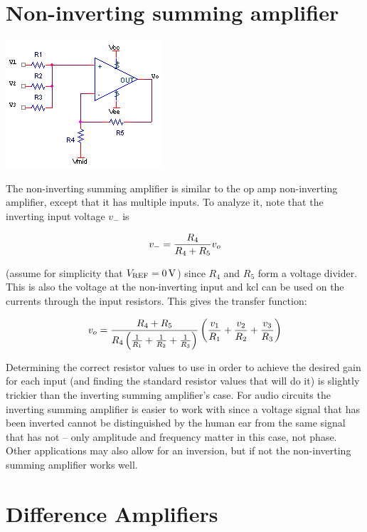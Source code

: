 \section{Non-inverting summing amplifier}
\begin{center}
	\includegraphics{schematics/summingamp.PNG}
\end{center}
The non-inverting summing amplifier is similar to the op amp non-inverting amplifier, except that it has multiple inputs. To analyze it, note that the inverting input voltage $v_{-}$ is

\begin{equation}
v_{-} = \frac{R_4}{R_4 + R_5}\vout
\end{equation}

(assume for simplicity that $V\sub{REF} = \SI{0}{\V}$) since $R_4$ and $R_5$ form a voltage divider.
This is also the voltage at the non-inverting input and \ac{kcl} can be used on the currents through the input resistors.
This gives the transfer function:

\textcolor{red}{
\begin{equation}
\vout = \frac{R_4 + R_5}{R_4\left(\frac{1}{R_1} + \frac{1}{R_2} + \frac{1}{R_3}\right)}\left(\frac{v_1}{R_1} + \frac{v_2}{R_2} + \frac{v_3}{R_3}\right)
\label{eq:summingamp}
\end{equation}
}

Determining the correct resistor values to use in order to achieve the desired gain for each input (and finding the standard resistor values that will do it) is slightly trickier than the inverting summing amplifier's case.
For audio circuits the inverting summing amplifier is easier to work with since a voltage signal that has been inverted cannot be distinguished by the human ear from the same signal that has not -- only amplitude and frequency matter in this case, not phase.
Other applications may also allow for an inversion, but if not the non-inverting summing amplifier works well.

\section{Difference Amplifiers}

